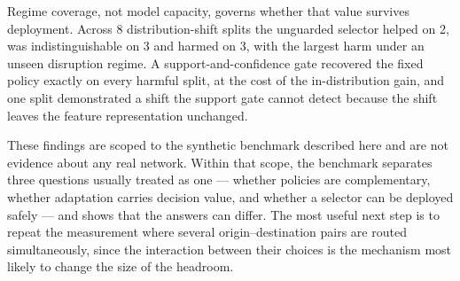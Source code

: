\documentclass[runningheads]{llncs}
\begin{document}
Regime coverage, not model capacity, governs whether that value survives
deployment. Across 8 distribution-shift splits the unguarded
selector helped on 2, was indistinguishable on 3
and harmed on 3, with the largest harm under an unseen disruption
regime. A support-and-confidence gate recovered the fixed policy exactly on
every harmful split, at the cost of the in-distribution gain, and one split
demonstrated a shift the support gate cannot detect because the shift leaves the
feature representation unchanged.

These findings are scoped to the synthetic benchmark described here and are not
evidence about any real network. Within that scope, the benchmark separates
three questions usually treated as one --- whether policies are complementary,
whether adaptation carries decision value, and whether a selector can be
deployed safely --- and shows that the answers can differ. The most useful next
step is to repeat the measurement where several origin--destination pairs are
routed simultaneously, since the interaction between their choices is the
mechanism most likely to change the size of the headroom.




\end{document}
